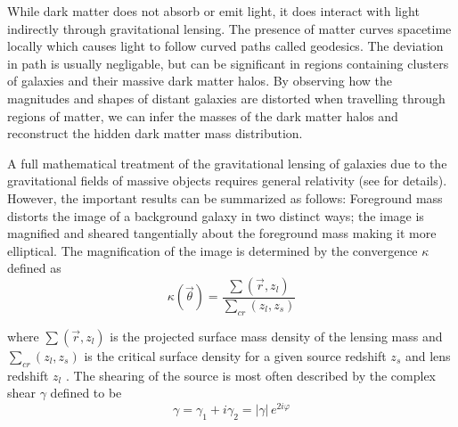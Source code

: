 \documentclass[%
 reprint,
 amsmath,amssymb,
 aps,nofootinbib
]{revtex4-1}
\begin{document}
While dark matter does not absorb or emit light, it does interact with light indirectly through gravitational lensing. The presence of matter curves spacetime locally which causes light to follow curved paths called geodesics. The deviation in path is usually negligable, but can be significant in regions containing clusters of galaxies and their massive dark matter halos. By observing how the magnitudes and shapes of distant galaxies are distorted when travelling through regions of matter, we can infer the masses of the dark matter halos and reconstruct the hidden dark matter mass distribution. %


A full mathematical treatment of the gravitational lensing of galaxies due to the gravitational fields of massive objects requires general relativity (see \cite{modern_cosmology} for details). However, the important results can be summarized as follows: Foreground mass distorts the image of a background galaxy in two distinct ways; the image is magnified and sheared tangentially about the foreground mass making it more elliptical. The magnification of the image is determined by the convergence $\kappa$ defined as
\begin{equation}\label{convergence}
\kappa(\vec{\theta})=\frac{\sum(\vec{r},z_l)}{\sum_{cr}(z_l,z_s)}
\end{equation}

\noindent where $\sum(\vec{r},z_l)$ is the projected surface mass density of the lensing mass and $\sum_{cr}(z_l,z_s)$ is the critical surface density for a given source redshift $z_s$ and lens redshift $z_l$ \cite{schneider}. The shearing of the source is most often described by the complex shear $\gamma$ defined to be
\begin{equation}\label{complex_shear}
\gamma=\gamma_1+i\gamma_2=|\gamma|\,e^{2i\varphi}
\end{equation}
\end{document}
